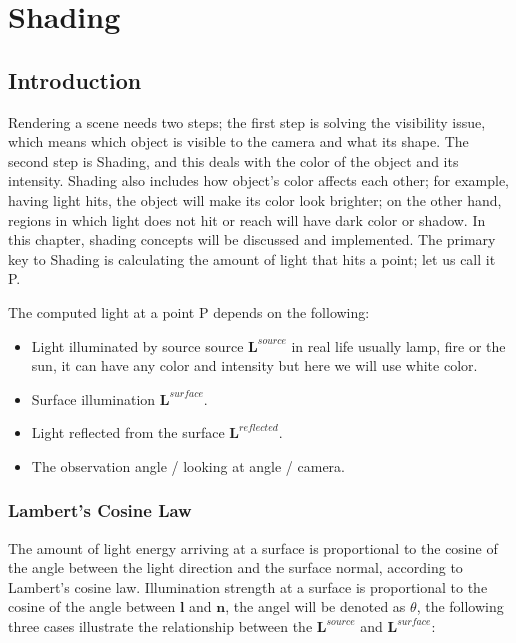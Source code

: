 \documentclass{article}
\begin{document}
	\clearpage
	
	
	
	
	\section{Shading}
	\subsection{Introduction}
	
	Rendering a scene needs two steps; the first step is solving the visibility issue, which means which object is visible to the camera and what its shape. The second step is Shading, and this deals with the color of the object and its intensity. Shading also includes how object's color affects each other; for example, having light hits, the object will make its color look brighter; on the other hand, regions in which light does not hit or reach will have dark color or shadow. In this chapter, shading concepts will be discussed and implemented.  The primary key to Shading is calculating the amount of light that hits a point; let us call it P. 
	
	The computed light at a point P depends on the following: 
	
	\begin{itemize}
		\item Light illuminated by source source  $\pmb{L}^{source}$  in real life usually lamp, fire or the sun, it can have any color and intensity but here we will use white color. 
		\item Surface illumination $\pmb{L}^{surface}$.
		\item Light reflected from the surface $\pmb{L}^{reflected}$.
		\item The observation angle / looking at angle / camera. 
	\end{itemize}
	
	
	
	
	\subsubsection{Lambert's Cosine Law}
	The amount of light energy arriving at a surface is proportional to the cosine of the angle between the light direction and the surface normal, according to Lambert's cosine law. Illumination strength at a surface is proportional to the cosine of the angle between $\pmb{l}$ and $\pmb{n}$, the angel will be denoted as $\theta$, the following three cases illustrate the relationship between the  $\pmb{L}^{source}$ and  $\pmb{L}^{surface}$:
	
\end{document}

